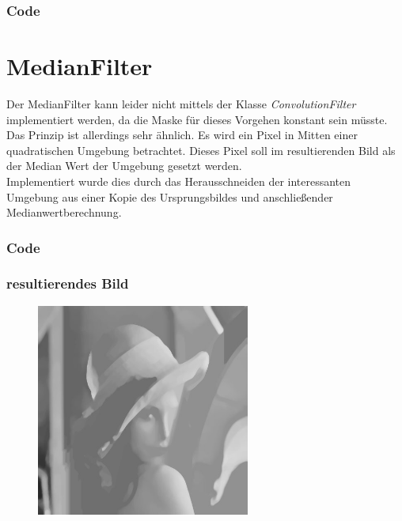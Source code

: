 \documentclass[12pt,german]{article}
\begin{document}
\subsubsection{Code}





\newpage
\section{MedianFilter}
Der MedianFilter kann leider nicht mittels der Klasse \textit{ConvolutionFilter} implementiert werden, da die Maske für dieses Vorgehen konstant sein müsste. Das Prinzip ist allerdings sehr ähnlich. Es wird ein Pixel in Mitten einer quadratischen Umgebung betrachtet. Dieses Pixel soll im resultierenden Bild als der Median Wert der Umgebung gesetzt werden. \\
Implementiert wurde dies durch das Herausschneiden der interessanten Umgebung aus einer Kopie des Ursprungsbildes und anschließender Medianwertberechnung. 
\subsubsection{Code}

\subsubsection{resultierendes Bild}
\begin{figure}[h]
	\includegraphics[width=7cm]{../testData/Results/median.jpg}
\end{figure}
\end{document}
